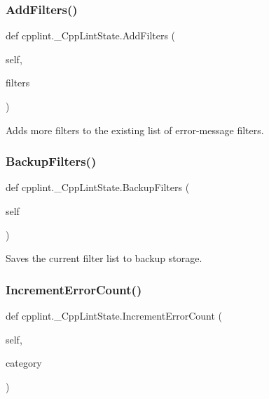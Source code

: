 \subsubsection{\texorpdfstring{Add\+Filters()}{AddFilters()}}
{\footnotesize\ttfamily def cpplint.\+\_\+\+Cpp\+Lint\+State.\+Add\+Filters (\begin{DoxyParamCaption}\item[{}]{self,  }\item[{}]{filters }\end{DoxyParamCaption})}

\begin{DoxyVerb}Adds more filters to the existing list of error-message filters. \end{DoxyVerb}
 \mbox{\label{classcpplint_1_1__CppLintState_a2444e784910e03681de22f43d4077dd1}} 
\subsubsection{\texorpdfstring{Backup\+Filters()}{BackupFilters()}}
{\footnotesize\ttfamily def cpplint.\+\_\+\+Cpp\+Lint\+State.\+Backup\+Filters (\begin{DoxyParamCaption}\item[{}]{self }\end{DoxyParamCaption})}

\begin{DoxyVerb}Saves the current filter list to backup storage.\end{DoxyVerb}
 \mbox{\label{classcpplint_1_1__CppLintState_a27a33a5049850d52cc8aef3478ca445a}} 
\subsubsection{\texorpdfstring{Increment\+Error\+Count()}{IncrementErrorCount()}}
{\footnotesize\ttfamily def cpplint.\+\_\+\+Cpp\+Lint\+State.\+Increment\+Error\+Count (\begin{DoxyParamCaption}\item[{}]{self,  }\item[{}]{category }\end{DoxyParamCaption})}

